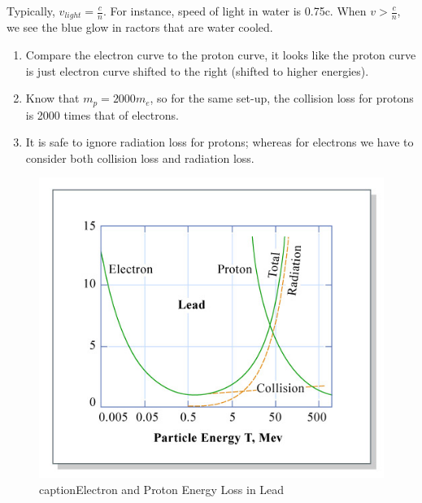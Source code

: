 \documentclass{school-22.101-notes}
\begin{document}
Typically, $v_{light} = \frac{c}{n}.$ For instance, speed of light in water is 0.75c. When $v> \frac{c}{n}$, we see the blue glow in ractors that are water cooled. 



\begin{enumerate}
\item Compare the electron curve to the proton curve, it looks like the proton curve is just electron curve shifted to the right (shifted to higher energies). 
\item Know that $m_p = 2000 m_e$, so for the same set-up, the collision loss for protons is 2000 times that of electrons. 
\item It is safe to ignore radiation loss for protons; whereas for electrons we have to consider both collision loss and radiation loss. 
\end{enumerate}

\begin{figure}[ht]
  \centering
  \includegraphics[width=5in]{images/ni/lead-ep.png}
  caption{Electron and Proton Energy Loss in Lead}
\end{figure}


\end{document}

